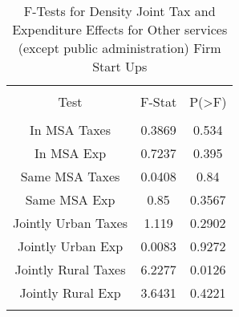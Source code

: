 
\begin{table}[!htbp] \centering 
  \caption{F-Tests for Density Joint Tax and Expenditure Effects for Other services (except public administration) Firm Start Ups} 
  \label{81Ftests} 
\begin{tabular}{@{\extracolsep{5pt}} ccc} 
\\[-1.8ex]\hline 
\hline \\[-1.8ex] 
Test & F-Stat & P(\textgreater F) \\ 
\hline \\[-1.8ex] 
In MSA Taxes & 0.3869 & 0.534 \\ 
In MSA Exp & 0.7237 & 0.395 \\ 
Same MSA Taxes & 0.0408 & 0.84 \\ 
Same MSA Exp & 0.85 & 0.3567 \\ 
Jointly Urban Taxes & 1.119 & 0.2902 \\ 
Jointly Urban Exp & 0.0083 & 0.9272 \\ 
Jointly Rural Taxes & 6.2277 & 0.0126 \\ 
Jointly Rural Exp & 3.6431 & 0.4221 \\ 
\hline \\[-1.8ex] 
\end{tabular} 
\end{table} 

